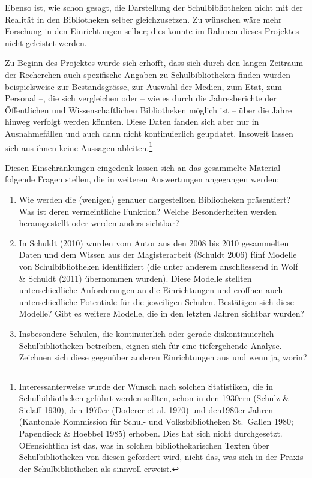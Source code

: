 \documentclass[a4paper,
fontsize=11pt,
oneside,
numbers=noperiodatend,
parskip=half-,
bibliography=totoc,
final
]{scrartcl}
\begin{document}
Ebenso ist, wie schon gesagt, die Darstellung der Schulbibliotheken
nicht mit der Realität in den Bibliotheken selber gleichzusetzen. Zu
wünschen wäre mehr Forschung in den Einrichtungen selber; dies konnte im
Rahmen dieses Projektes nicht geleistet werden.

Zu Beginn des Projektes wurde sich erhofft, dass sich durch den langen
Zeitraum der Recherchen auch spezifische Angaben zu Schulbibliotheken
finden würden -- beispielsweise zur Bestandsgrösse, zur Auswahl der
Medien, zum Etat, zum Personal --, die sich vergleichen oder -- wie es
durch die Jahresberichte der Öffentlichen und Wissenschaftlichen
Bibliotheken möglich ist -- über die Jahre hinweg verfolgt werden
könnten. Diese Daten fanden sich aber nur in Ausnahmefällen und auch
dann nicht kontinuierlich geupdatet. Insoweit lassen sich aus ihnen
keine Aussagen ableiten.\footnote{Interessanterweise wurde der Wunsch
  nach solchen Statistiken, die in Schulbibliotheken geführt werden
  sollten, schon in den 1930ern (Schulz \& Sielaff 1930), den 1970er
  (Doderer et al. 1970) und den1980er Jahren (Kantonale Kommission für
  Schul- und Volksbibliotheken St.~Gallen 1980; Papendieck \& Hoebbel
  1985) erhoben. Dies hat sich nicht durchgesetzt. Offensichtlich ist
  das, was in solchen bibliothekarischen Texten über Schulbibliotheken
  von diesen gefordert wird, nicht das, was sich in der Praxis der
  Schulbibliotheken als sinnvoll erweist.}

Diesen Einschränkungen eingedenk lassen sich an das gesammelte Material
folgende Fragen stellen, die in weiteren Auswertungen angegangen werden:

\begin{enumerate}
\def\labelenumi{\arabic{enumi}.}
\item
  Wie werden die (wenigen) genauer dargestellten Bibliotheken
  präsentiert? Was ist deren vermeintliche Funktion? Welche
  Besonderheiten werden herausgestellt oder werden anders sichtbar?
\item
  In Schuldt (2010) wurden vom Autor aus den 2008 bis 2010 gesammelten
  Daten und dem Wissen aus der Magisterarbeit (Schuldt 2006) fünf
  Modelle von Schulbibliotheken identifiziert (die unter anderem
  anschliessend in Wolf \& Schuldt (2011) übernommen wurden). Diese
  Modelle stellten unterschiedliche Anforderungen an die Einrichtungen
  und eröffnen auch unterschiedliche Potentiale für die jeweiligen
  Schulen. Bestätigen sich diese Modelle? Gibt es weitere Modelle, die
  in den letzten Jahren sichtbar wurden?
\item
  Insbesondere Schulen, die kontinuierlich oder gerade diskontinuierlich
  Schulbibliotheken betreiben, eignen sich für eine tiefergehende
  Analyse. Zeichnen sich diese gegenüber anderen Einrichtungen aus und
  wenn ja, worin?
\end{enumerate}
\end{document}
